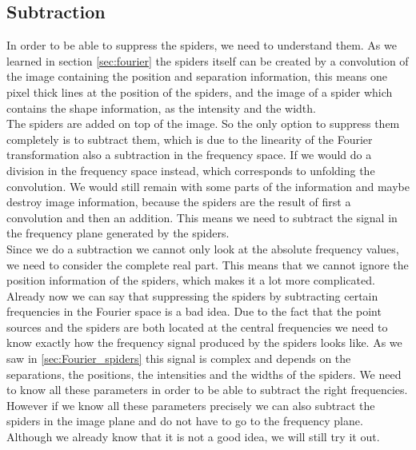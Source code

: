 \subsection{Subtraction}
\label{sec:suppression_subtraction}
In order to be able to suppress the spiders, we need to understand them. As we learned in section \ref{sec:fourier} the spiders itself can be created by a convolution of the image containing the position and separation information, this means one pixel thick lines at the position of the spiders, and the image of a spider which contains the shape information, as the intensity and the width.\\
The spiders are added on top of the image. So the only option to suppress them completely is to subtract them, which is due to the linearity of the Fourier transformation also a subtraction in the frequency space. If we would do a division in the frequency space instead, which corresponds to unfolding the convolution. We would still remain with some parts of the information and maybe destroy image information, because the spiders are the result of first a convolution and then an addition.  This means we need to subtract the signal in the frequency plane generated by the spiders.\\
Since we do a subtraction we cannot only look at the absolute frequency values, we need to consider the complete real part. This means that we cannot ignore the position information of the spiders, which makes it a lot more complicated. Already now we can say that suppressing the spiders by subtracting certain frequencies in the Fourier space is a bad idea. Due to the fact that the point sources and the spiders are both located at the central frequencies we need to know exactly how the frequency signal produced by the spiders looks like. As we saw in \ref{sec:Fourier_spiders} this signal is complex and depends on the separations, the positions, the intensities and the widths of the spiders. We need to know all these parameters in order to be able to subtract the right frequencies. However if we know all these parameters precisely we can also subtract the spiders in the image plane and do not have to go to the frequency plane. Although we already know that it is not a good idea, we will still try it out. \\
